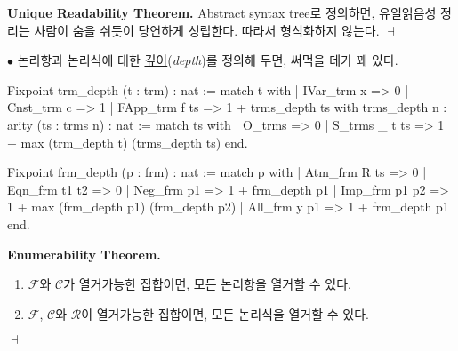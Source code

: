 \documentclass[12pt]{paper}
\newenvironment{context}[1][]
{ \noindent \textbf{{#1}.} }
{ \hfill $ \dashv $ }
\begin{document}
\newpage

\begin{context}[Unique Readability Theorem]
Abstract syntax tree로 정의하면, 유일읽음성 정리는 사람이 숨을 쉬듯이 당연하게 성립한다.
따라서 형식화하지 않는다.
\end{context}

\par \noindent $\bullet$
논리항과 논리식에 대한 \underline{깊이}(\textit{depth})를 정의해 두면, 써먹을 데가 꽤 있다.
\begin{coqcode}
Fixpoint trm_depth (t : trm) : nat :=
  match t with
  | IVar_trm x => 0
  | Cnst_trm c => 1
  | FApp_trm f ts => 1 + trms_depth ts
with trms_depth {n : arity} (ts : trms n) : nat :=
  match ts with
  | O_trms => 0
  | S_trms _ t ts => 1 + max (trm_depth t) (trms_depth ts)
  end.

Fixpoint frm_depth (p : frm) : nat :=
  match p with
  | Atm_frm R ts => 0
  | Eqn_frm t1 t2 => 0
  | Neg_frm p1 => 1 + frm_depth p1
  | Imp_frm p1 p2 => 1 + max (frm_depth p1) (frm_depth p2)
  | All_frm y p1 => 1 + frm_depth p1
  end.
\end{coqcode}

\begin{context}[Enumerability Theorem]
\begin{enumerate}
\item $\mathcal{F}$와 $\mathcal{C}$가 열거가능한 집합이면, 모든 논리항을 열거할 수 있다.
\item $\mathcal{F}$, $\mathcal{C}$와 $\mathcal{R}$이 열거가능한 집합이면, 모든 논리식을 열거할 수 있다.
\end{enumerate}
\end{context}
\end{document}
